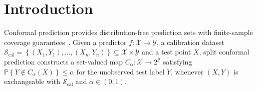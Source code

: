 \documentclass{uai2026} %
\newcommand{\1}{\mathbf{1}}
\newcommand{\prob}{\mathbb{P}}
\newcommand{\xcal}{\mathcal{X}}
\newcommand{\ycal}{\mathcal{Y}}
\newcommand{\scal}{\mathcal{S}}
\newcommand{\ens}[1]{\left\{#1\right\}}
\newcommand{\cali}{\mathrm{cal}}
\newcommand{\scalcal}{\scal_{\cali}}
\begin{document}


\section{Introduction}
Conformal prediction provides distribution-free prediction sets with finite-sample coverage guarantees~\citep{vovk2005algorithmic,angelopoulos2024theoretical,shafer2008tutorial}.
Given a predictor $f:\xcal\to\ycal$, a calibration dataset $\scalcal=\ens{(X_1,Y_1),\ldots,(X_n,Y_n)}\subseteq\xcal\times\ycal$ and a test point $X$, split conformal prediction constructs a set-valued map $C_\alpha:\xcal \to 2^{\ycal}$ satisfying $  \prob\ens{Y\not\in C_\alpha(X)}\le \alpha$ for the unobserved test label $Y$, whenever $(X,Y)$ is exchangeable with $\scalcal$ and $\alpha\in(0,1)$.
\end{document}
